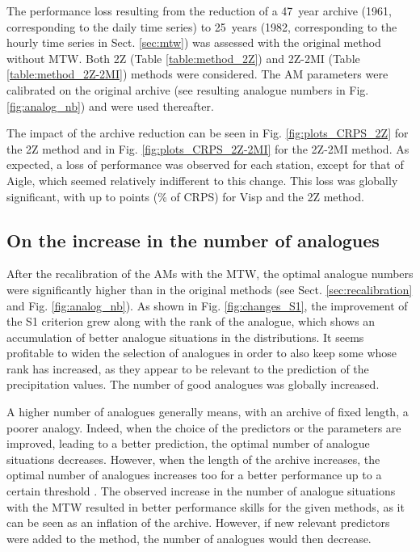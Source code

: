 \documentclass[hess, manuscript]{copernicus}
\begin{document}
	
	
	The performance loss resulting from the reduction of a 47~year archive (1961, corresponding to the daily time series) to 25~years (1982, corresponding to the hourly time series in Sect. \ref{sec:mtw}) was assessed with the original method without MTW. Both 2Z (Table \ref{table:method_2Z}) and 2Z-2MI (Table \ref{table:method_2Z-2MI}) methods were considered. The AM parameters were calibrated on the original archive (see resulting analogue numbers in Fig. \ref{fig:analog_nb}) and were used thereafter.
	
	The impact of the archive reduction can be seen in Fig. \ref{fig:plots_CRPS_2Z} for the 2Z method and in Fig. \ref{fig:plots_CRPS_2Z-2MI} for the 2Z-2MI method. As expected, a loss of performance was observed for each station, except for that of Aigle, which seemed relatively indifferent to this change. This loss was globally significant, with up to  points (\% of CRPS) for Visp and the 2Z method. 
	
	
	
	\subsection{On the increase in the number of analogues}
	
	After the recalibration of the AMs with the MTW, the optimal analogue numbers were significantly higher than in the original methods (see Sect. \ref{sec:recalibration} and Fig. \ref{fig:analog_nb}). As shown in Fig. \ref{fig:changes_S1}, the improvement of the S1 criterion grew along with the rank of the analogue, which shows an accumulation of better analogue situations in the distributions. It seems profitable to widen the selection of analogues in order to also keep some whose rank has increased, as they appear to be relevant to the prediction of the precipitation values. The number of good analogues was globally increased.
	
	A higher number of analogues generally means, with an archive of fixed length, a poorer analogy. Indeed, when the choice of the predictors or the parameters are improved, leading to a better prediction, the optimal number of analogue situations decreases. However, when the length of the archive increases, the optimal number of analogues increases too for a better performance up to a certain threshold \citep[][]{Bontron2004, Hamill2006a}. The observed increase in the number of analogue situations with the MTW resulted in better performance skills for the given methods, as it can be seen as an inflation of the archive. However, if new relevant predictors were added to the method, the number of analogues would then decrease.
	
\end{document}

